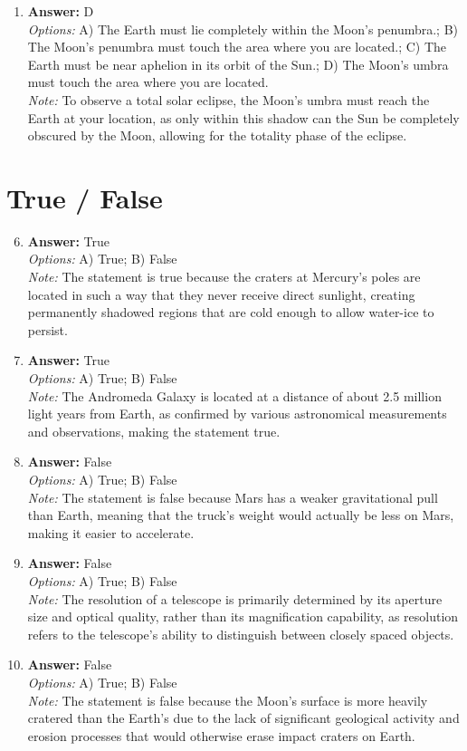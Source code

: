 \documentclass[12pt]{article}
\begin{document}
\begin{enumerate}[label=\arabic*.]
\item \textbf{Answer:} D
\\ \textit{Options:} A) The Earth must lie completely within the Moon's penumbra.; B) The Moon's penumbra must touch the area where you are located.; C) The Earth must be near aphelion in its orbit of the Sun.; D) The Moon's umbra must touch the area where you are located.
\\ \textit{Note:} To observe a total solar eclipse, the Moon's umbra must reach the Earth at your location, as only within this shadow can the Sun be completely obscured by the Moon, allowing for the totality phase of the eclipse.
\end{enumerate}

\section*{True / False}
\begin{enumerate}[label=\arabic*.]
\setcounter{enumi}{5}
\item \textbf{Answer:} True
\\ \textit{Options:} A) True; B) False
\\ \textit{Note:} The statement is true because the craters at Mercury's poles are located in such a way that they never receive direct sunlight, creating permanently shadowed regions that are cold enough to allow water-ice to persist.
\item \textbf{Answer:} True
\\ \textit{Options:} A) True; B) False
\\ \textit{Note:} The Andromeda Galaxy is located at a distance of about 2.5 million light years from Earth, as confirmed by various astronomical measurements and observations, making the statement true.
\item \textbf{Answer:} False
\\ \textit{Options:} A) True; B) False
\\ \textit{Note:} The statement is false because Mars has a weaker gravitational pull than Earth, meaning that the truck's weight would actually be less on Mars, making it easier to accelerate.
\item \textbf{Answer:} False
\\ \textit{Options:} A) True; B) False
\\ \textit{Note:} The resolution of a telescope is primarily determined by its aperture size and optical quality, rather than its magnification capability, as resolution refers to the telescope's ability to distinguish between closely spaced objects.
\item \textbf{Answer:} False
\\ \textit{Options:} A) True; B) False
\\ \textit{Note:} The statement is false because the Moon's surface is more heavily cratered than the Earth's due to the lack of significant geological activity and erosion processes that would otherwise erase impact craters on Earth.
\end{enumerate}
\end{document}
